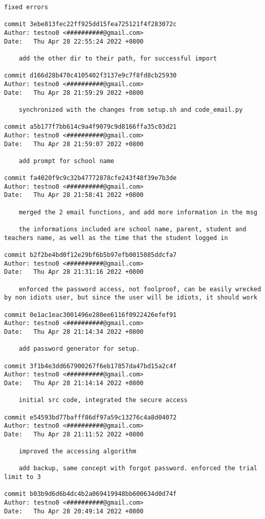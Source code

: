 \documentclass[12pt]{article}
\begin{document}
\begin{lstlisting}[caption={\texttt{git} log of the development.}]
	fixed errors

commit 3ebe813fec22ff925dd15fea725121f4f283072c
Author: testno0 <##########@gmail.com>
Date:   Thu Apr 28 22:55:24 2022 +0800

	add the other dir to their path, for successful import

commit d166d28b470c4105402f3137e9c7f8fd8cb25930
Author: testno0 <##########@gmail.com>
Date:   Thu Apr 28 21:59:29 2022 +0800

	synchronized with the changes from setup.sh and code_email.py

commit a5b177f7bb614c9a4f9079c9d8166ffa35c03d21
Author: testno0 <##########@gmail.com>
Date:   Thu Apr 28 21:59:07 2022 +0800

	add prompt for school name

commit fa4020f9c9c32b47772878cfe243f48f39e7b3de
Author: testno0 <##########@gmail.com>
Date:   Thu Apr 28 21:58:41 2022 +0800

	merged the 2 email functions, and add more information in the msg

	the informations included are school name, parent, student and teachers name, as well as the time that the student logged in

commit b2f2be4bd0f12e29bf6b5b97efb0015085ddcfa7
Author: testno0 <##########@gmail.com>
Date:   Thu Apr 28 21:31:16 2022 +0800

	enforced the password access, not foolproof, can be easily wrecked by non idiots user, but since the user will be idiots, it should work

commit 0e1ac1eac3001496e280ee6116f0922426efef91
Author: testno0 <##########@gmail.com>
Date:   Thu Apr 28 21:14:34 2022 +0800

	add password generator for setup.

commit 3f1b4e3dd667900267f6eb17857da47bd15a2c4f
Author: testno0 <##########@gmail.com>
Date:   Thu Apr 28 21:14:14 2022 +0800

	initial src code, integrated the secure access

commit e54593bd77bafff86df97a59c13276c4a8d04072
Author: testno0 <##########@gmail.com>
Date:   Thu Apr 28 21:11:52 2022 +0800

	improved the accessing algorithm

	add backup, same concept with forgot password. enforced the trial limit to 3

commit b03b9d6d6b4dc4b2a069419948bb600634d0d74f
Author: testno0 <##########@gmail.com>
Date:   Thu Apr 28 20:49:14 2022 +0800


\end{lstlisting}
\end{document}
